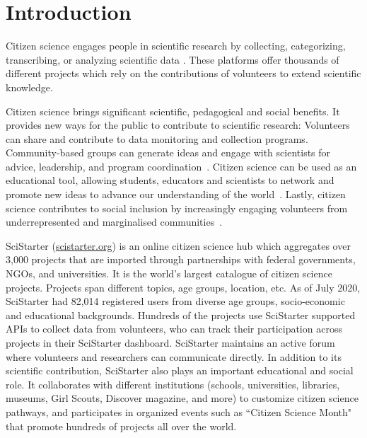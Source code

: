 \documentclass[letterpaper]{article} %
\begin{document}
%
%
\section{Introduction}

Citizen science engages people in scientific research  by collecting, categorizing, transcribing, or analyzing scientific data \cite{bonney2009citizen,funk2017science,brossard2005scientific}.
 These platforms
 offer thousands of different projects which rely on the contributions of volunteers to extend
 scientific knowledge.

    Citizen science brings   significant scientific, pedagogical and social benefits. It provides new ways for the public to
   contribute to scientific research: Volunteers
   can share and contribute to data monitoring and collection programs. Community-based groups can generate ideas and engage with scientists for advice, leadership, and program coordination~\cite{silvertown2009new,bonney2014next,ryan2018role}. Citizen science can be used as an educational tool, allowing students, educators and scientists to  network and promote new ideas to advance our understanding of the world~\cite{vitone2016school}. Lastly, citizen science contributes to social inclusion by increasingly engaging volunteers from underrepresented and marginalised communities~\cite{haywood2014education,sorensen2019reflecting}.


      SciStarter (\url{scistarter.org}) is  an online citizen science hub  which aggregates over
      3,000 projects that are imported through partnerships with federal governments, NGOs, and universities. It is the world’s largest catalogue of citizen science projects.  Projects span different topics, age groups, location, etc. As of July 2020, SciStarter had  82,014 registered users   from diverse age groups, socio-economic and educational backgrounds. Hundreds of the projects use SciStarter supported APIs to collect data from volunteers, who can track their participation  across projects in their SciStarter dashboard. SciStarter maintains
      an active forum where volunteers and researchers can communicate directly. In addition to its scientific contribution, SciStarter also plays an important educational and social role. It collaborates with
     different institutions (schools, universities, libraries, museums, Girl Scouts, Discover magazine, and more)  to customize citizen science pathways, and participates in
      organized events such as ``Citizen Science Month" that promote hundreds of projects all over the world.
\end{document}

